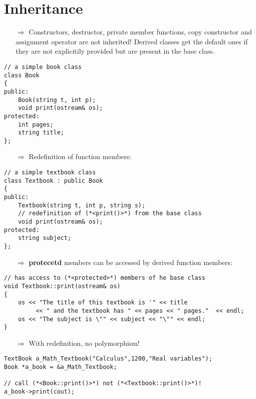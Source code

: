 \documentclass[10pt]{article}
\begin{document}
\section{Inheritance}
\small
\begin{enumerate}
\item[$\Rightarrow$] Constructors, destructor, private member functions, copy constructor
and assignment operator are not inherited! Derived classes get the default ones
if they are not explicitily provided but are present in the base class.
\end{enumerate}
\begin{lstlisting}
// a simple book class
class Book
{
public:
    Book(string t, int p);
    void print(ostream& os);
protected:
    int pages;
    string title;
};
\end{lstlisting}
\begin{enumerate}
\item[$\Rightarrow$] Redefinition of function members:
\end{enumerate}
\begin{lstlisting}
// a simple textbook class
class Textbook : public Book
{
public:
    Textbook(string t, int p, string s);
    // redefinition of (*<print()>*) from the base class
    void print(ostream& os);
protected:
    string subject;
};
\end{lstlisting}
\begin{enumerate}
\item[$\Rightarrow$] \textbf{protecetd} members can be accessed
by derived function members:
\end{enumerate}
\begin{lstlisting}
// has access to (*<protected>*) members of he base class
void Textbook::print(ostream& os)
{
    os << "The title of this textbook is '" << title
         << " and the textbook has " << pages << " pages."  << endl;
    os << "The subject is \"" << subject << "\"" << endl;
}
\end{lstlisting}
\begin{enumerate}
\item[$\Rightarrow$] With redefinition, no polymorphism!
\end{enumerate}
\begin{lstlisting}
TextBook a_Math_Textbook("Calculus",1200,"Real variables");
Book *a_book = &a_Math_Textbook;

// call (*<Book::print()>*) not (*<Textbook::print()>*)!
a_book->print(cout);
\end{lstlisting}
%
%
\end{document}
